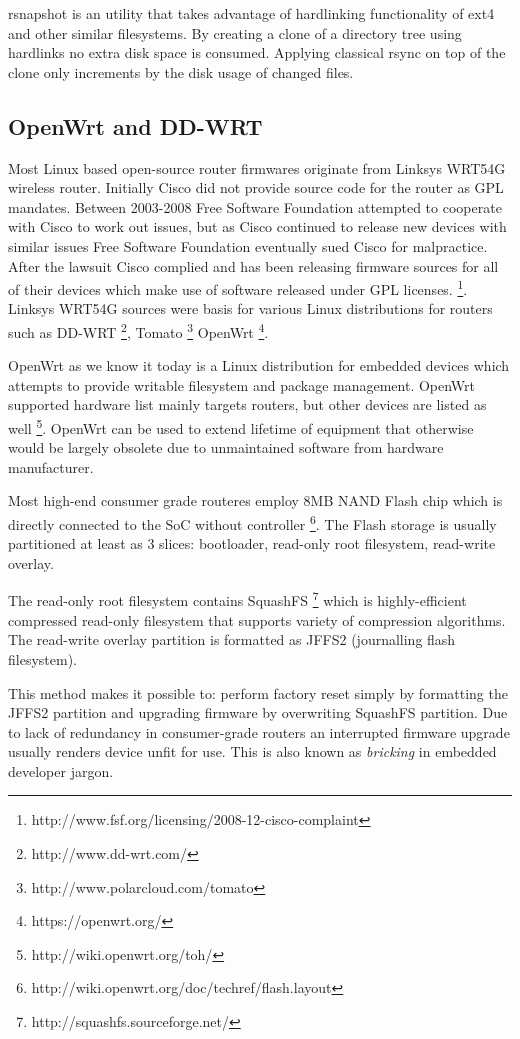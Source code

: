 \documentclass[a4paper,11pt]{kth-mag}
\begin{document}
rsnapshot is an utility that takes advantage of hardlinking
functionality of ext4 and other similar filesystems.
By creating a clone of a directory tree using hardlinks no
extra disk space is consumed. Applying classical rsync on top of
the clone only increments by the disk usage of changed files.


\subsection{OpenWrt and DD-WRT}

Most Linux based open-source router firmwares originate from
Linksys WRT54G wireless router.
Initially Cisco did not provide source code for the router as GPL mandates.
Between 2003-2008 Free Software Foundation attempted to cooperate
with Cisco to work out issues, but as Cisco continued to release
new devices with similar issues Free Software Foundation eventually
sued Cisco for malpractice.
After the lawsuit Cisco complied and has been releasing firmware
sources for all of their devices which make use of software
released under GPL licenses.
\footnote{http://www.fsf.org/licensing/2008-12-cisco-complaint}.
Linksys WRT54G sources were basis for various Linux distributions for routers such as
DD-WRT \footnote{http://www.dd-wrt.com/},
Tomato \footnote{http://www.polarcloud.com/tomato}
OpenWrt \footnote{https://openwrt.org/}.

OpenWrt as we know it today is a Linux distribution for embedded devices
which attempts to provide writable filesystem and package management.
OpenWrt supported hardware list mainly targets routers, but other devices are
listed as well \footnote{http://wiki.openwrt.org/toh/}. OpenWrt can be used to
extend lifetime of equipment that otherwise would be largely obsolete due
to unmaintained software from hardware manufacturer.

Most high-end consumer grade routeres employ 8MB NAND Flash chip which is
directly connected to the SoC without controller
\footnote{http://wiki.openwrt.org/doc/techref/flash.layout}.
The Flash storage is usually partitioned at least as 3 slices:
bootloader, read-only root filesystem, read-write overlay.

The read-only root filesystem contains SquashFS
\footnote{http://squashfs.sourceforge.net/}
which is highly-efficient compressed read-only filesystem that
supports variety of compression algorithms.
The read-write overlay partition
is formatted as JFFS2 (journalling flash filesystem).

This method makes it possible to: perform factory reset simply by
formatting the JFFS2 partition and upgrading firmware by overwriting
SquashFS partition. Due to lack of redundancy in consumer-grade routers
an interrupted firmware upgrade usually renders device unfit for use.
This is also known as \emph{bricking} in embedded developer jargon.
\end{document}
